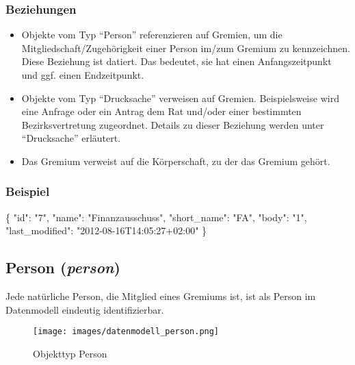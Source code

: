 \documentclass[,a4paper]{article}
\makeatletter
\newenvironment{Shaded}{}{}
\newcommand{\DataTypeTok}[1]{\textcolor[rgb]{0.56,0.13,0.00}{{#1}}}
\newcommand{\StringTok}[1]{\textcolor[rgb]{0.25,0.44,0.63}{{#1}}}
\newcommand{\NormalTok}[1]{{#1}}
\def\maxwidth{\ifdim\Gin@nat@width>\linewidth\linewidth
\else\Gin@nat@width\fi}
\let\Oldincludegraphics\includegraphics
\renewcommand{\includegraphics}[1]{\Oldincludegraphics[width=\maxwidth]{#1}}
\makeatother
\begin{document}
\subsubsection{Beziehungen}

\begin{itemize}
\item
  Objekte vom Typ ``Person'' referenzieren auf Gremien, um die
  Mitgliedschaft/Zugehörigkeit einer Person im/zum Gremium zu
  kennzeichnen. Diese Beziehung ist datiert. Das bedeutet, sie hat einen
  Anfangszeitpunkt und ggf. einen Endzeitpunkt.
\item
  Objekte vom Typ ``Drucksache'' verweisen auf Gremien. Beispielsweise
  wird eine Anfrage oder ein Antrag dem Rat und/oder einer bestimmten
  Bezirksvertretung zugeordnet. Details zu dieser Beziehung werden unter
  ``Drucksache'' erläutert.
\item
  Das Gremium verweist auf die Körperschaft, zu der das Gremium gehört.
\end{itemize}

\subsubsection{Beispiel}

\begin{Shaded}
\begin{Highlighting}[]
\NormalTok{\{}
    \DataTypeTok{"id"}\NormalTok{: }\StringTok{"7"}\NormalTok{,}
    \DataTypeTok{"name"}\NormalTok{: }\StringTok{"Finanzausschuss"}\NormalTok{,}
    \DataTypeTok{"short_name"}\NormalTok{: }\StringTok{"FA"}\NormalTok{,}
    \DataTypeTok{"body"}\NormalTok{: }\StringTok{"1"}\NormalTok{,}
    \DataTypeTok{"last_modified"}\NormalTok{: }\StringTok{"2012-08-16T14:05:27+02:00"}
\NormalTok{\}}
\end{Highlighting}
\end{Shaded}

\subsection{Person (\emph{person})}

Jede natürliche Person, die Mitglied eines Gremiums ist, ist als Person
im Datenmodell eindeutig identifizierbar.

\begin{figure}[htbp]
\centering
\texttt{[image: images/datenmodell\_person.png]}
\caption{Objekttyp Person}
\end{figure}
\end{document}
